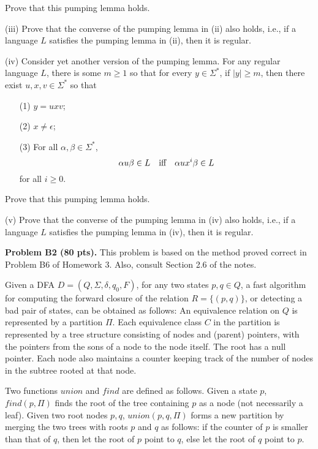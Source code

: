 \documentclass[12pt]{article}
\begin{document}
Prove that this pumping lemma holds.

\medskip
(iii)
Prove that the converse of the pumping lemma in (ii) also holds,
i.e., if a language $L$ satisfies the pumping lemma in (ii),
then it is regular.

\medskip
(iv)
Consider yet another version of the pumping lemma.
For any regular language $L$, there is some $m \geq 1$ so that
for every $y\in \Sigma^*$, if $|y| \geq m$, then there exist
$u, x, v\in \Sigma^*$ so that
\begin{enumerate}
\item[(1)]
$y = uxv$;
\item[(2)]
$x\not= \epsilon$;
\item[(3)]
For all $\alpha, \beta\in \Sigma^*$,
\[\alpha u\beta \in L
\quad\hbox{iff}\quad
\alpha ux^i \beta\in L\]
for all $i\geq 0$.
\end{enumerate}

Prove that this pumping lemma holds.

\medskip
(v)
Prove that the converse of the pumping lemma in (iv) also holds,
i.e., if a language $L$ satisfies the pumping lemma in (iv),
then it is regular.




\vspace {0.25cm}\noindent
{\bf Problem B2 (80 pts).}
This problem is based on the method
proved correct in Problem B6 of Homework $3$.
Also, consult Section 2.6 of the notes.

\medskip
Given a DFA $D = (Q, \Sigma, \delta, q_0, F)$,
for any two states $p, q\in Q$,
a fast algorithm for computing the forward closure of the
relation $R = \{(p, q)\}$, or detecting a bad pair of states,
can be obtained as follows:  An equivalence relation on $Q$ is
represented by a partition $\Pi$. Each equivalence class
$C$ in the partition is represented by a tree structure
consisting of nodes and (parent) pointers, with the
pointers from the sons of a node
to the node itself. The root has a null pointer.
Each node also maintains a counter keeping track
of the number of nodes in the subtree rooted at that node.

\medskip
Two functions $union$ and $find$ are defined as follows.
Given a state $p$, $find(p,\Pi)$ finds the root
of the tree containing $p$ as a node (not necessarily a leaf).
Given two root nodes $p, q$, $union(p, q, \Pi)$ forms
a new partition by merging the two trees with roots $p$ and $q$
as follows: if the counter of $p$ is smaller than
that of $q$, then let the root of $p$ point to $q$,
else let the root of $q$ point to $p$.
\end{document}
